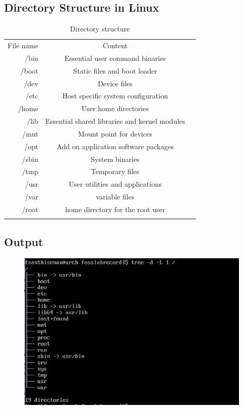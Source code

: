 \documentclass{article}
\begin{document}
\newpage

\subsection{Directory Structure in Linux}
\begin{table}[htb]
\caption{Directory structure}
\label{Directory Structure in Linux}
\begin{tabular}{rcc}
\noalign{\smallskip} \hline \hline \noalign{\smallskip}
File name & Content\\
/bin & Essential user command binaries\\
/boot & Static files and boot loader\\
/dev & Device files\\
/etc & Host specific system configuration\\
/home & User home directories\\
/lib & Essential shared libraries and kernel modules\\
/mnt & Mount point for devices\\
/opt & Add on application software packages\\
/sbin & System binaries\\
/tmp & Temporary files\\
/usr & User utilities and applications\\
/var &variable files\\
/root & home directory for the root user\\ 
\hline
\noalign{\smallskip} \hline \noalign{\smallskip}
\end{tabular}
\end{table}


\subsection{Output}
\begin{figure}[h!]
	\includegraphics[width=\linewidth]{./outputs/exp1.jpg}
\end{figure}
\end{document}
